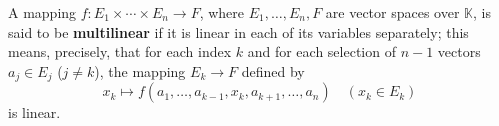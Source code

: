 A mapping $f: E_1 \times \cdots \times E_n \to F$, where $E_1, \ldots, E_n, F$ are vector spaces over $\mathbb{K}$, is said to be \textbf{multilinear} if it is linear in each of its variables separately; this means, precisely, that for each index $k$ and for each selection of $n-1$ vectors $a_j \in E_j$ ($j \neq k$), the mapping $E_k \to F$ defined by
$$x_k \mapsto f(a_1, \ldots, a_{k-1}, x_k, a_{k+1}, \ldots, a_n) \quad (x_k \in E_k)$$
is linear.
